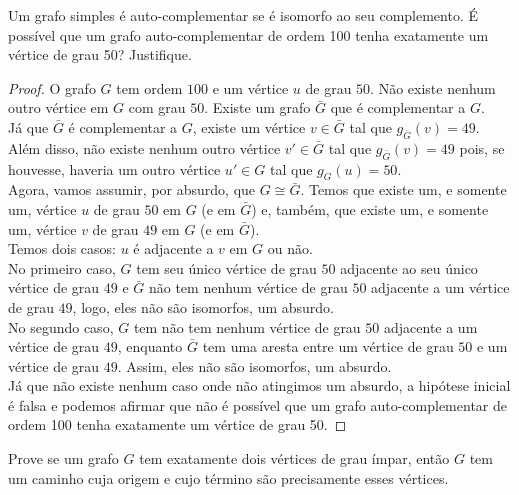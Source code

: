 \documentclass[12pt]{article}
\newenvironment{problem}[2][Ex]{\begin{trivlist}
\item[\hskip \labelsep {\bfseries #1}\hskip \labelsep {\bfseries #2.}]}{\end{trivlist}}
\begin{document}
\begin{problem}{E3}
Um grafo simples é auto-complementar se é isomorfo ao seu complemento. É possível que um grafo auto-complementar de ordem 100 tenha exatamente um vértice de grau 50? Justifique.
\end{problem}
 
\begin{proof}
O grafo $G$ tem ordem $100$ e um vértice $u$ de grau $50$. Não existe nenhum outro vértice em $G$ com grau $50$. Existe um grafo $\bar{G}$ que é complementar a $G$. \\
Já que $\bar{G}$ é complementar a $G$, existe um vértice $v \in \bar{G}$ tal que $g_{\bar{G}}(v) = 49$. Além disso, não existe nenhum outro vértice $v' \in \bar{G}$ tal que $g_{\bar{G}}(v) = 49$ pois, se houvesse, haveria um outro vértice $u' \in G$ tal que $g_{G}(u) = 50$. \\
Agora, vamos assumir, por absurdo, que $G \cong \bar{G}$. Temos que existe um, e somente um, vértice $u$ de grau $50$ em $G$ (e em $\bar{G}$) e, também, que existe um, e somente um, vértice $v$ de grau $49$ em $G$ (e em $\bar{G}$). \\
Temos dois casos: $u$ é adjacente a $v$ em $G$ ou não. \\
No primeiro caso, $G$ tem seu único vértice de grau $50$ adjacente ao seu único vértice de grau $49$ e $\bar{G}$ não tem nenhum vértice de grau $50$ adjacente a um vértice de grau $49$, logo, eles não são isomorfos, um absurdo. \\
No segundo caso, $G$ tem não tem nenhum vértice de grau $50$ adjacente a um vértice de grau $49$, enquanto $\bar{G}$ tem uma aresta entre um vértice de grau $50$ e um vértice de grau $49$. Assim, eles não são isomorfos, um absurdo. \\
Já que não existe nenhum caso onde não atingimos um absurdo, a hipótese inicial é falsa e podemos afirmar que não é possível que um grafo auto-complementar de ordem 100 tenha exatamente um vértice de grau 50.
\end{proof}

\begin{problem}{E4}
Prove se um grafo $G$ tem exatamente dois vértices de grau ímpar, então $G$ tem um caminho cuja origem e cujo término são precisamente esses vértices.
\end{problem}
\end{document}
